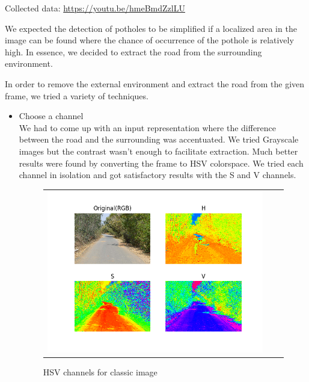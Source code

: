 \documentclass[12pt,a4paper]{article}
\begin{document}
Collected data: \url{ https://youtu.be/hmeBmdZzlLU }

We expected the detection of potholes to be simplified if a localized area in the image can be found where the chance of occurrence of the pothole is relatively high. In essence, we decided to extract the road from the surrounding environment.

In order to remove the external environment and extract the road from the given frame, we tried a variety of techniques. 

\begin{itemize}

\item Choose a channel \\
    We had to come up with an input representation where the difference between the road and the surrounding was accentuated. We tried Grayscale images but the contrast wasn't enough to facilitate extraction. Much better results were found by converting the frame to HSV colorspace. We tried each channel in isolation and got satisfactory results with the S and V channels. 

 \begin{figure}[!ht]
\begin{center}

\begin{tabular}{ccc}
\centering
\includegraphics[width = 6in]{images/rgb_hsv.png}
\end{tabular}
\caption{HSV channels for classic image}


\end{center}
\end{figure}
\end{itemize}
\end{document}
